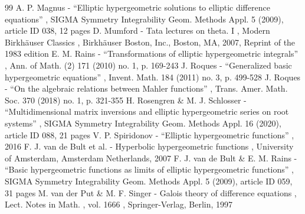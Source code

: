 \begin{thebibliography}{99}
 A. P. Magnus - “Elliptic hypergeometric solutions to elliptic difference equations” , SIGMA Symmetry Integrability Geom. Methods Appl. 5 (2009), article ID 038, 12 pages
 D. Mumford - Tata lectures on theta. I , Modern Birkhäuser Classics , Birkhäuser Boston, Inc., Boston, MA, 2007, Reprint of the 1983 edition
 E. M. Rains - “Transformations of elliptic hypergeometric integrals” , Ann. of Math. (2) 171 (2010) no. 1, p. 169-243
 J. Roques - “Generalized basic hypergeometric equations” , Invent. Math. 184 (2011) no. 3, p. 499-528
 J. Roques - “On the algebraic relations between Mahler functions” , Trans. Amer. Math. Soc. 370 (2018) no. 1, p. 321-355
 H. Rosengren \& M. J. Schlosser - “Multidimensional matrix inversions and elliptic hypergeometric series on root systems” , SIGMA Symmetry Integrability Geom. Methods Appl. 16 (2020), article ID 088, 21 pages
 V. P. Spiridonov - “Elliptic hypergeometric functions” , 2016
 F. J. van de Bult et al. - Hyperbolic hypergeometric functions , University of Amsterdam, Amsterdam Netherlands, 2007
 F. J. van de Bult \& E. M. Rains - “Basic hypergeometric functions as limits of elliptic hypergeometric functions” , SIGMA Symmetry Integrability Geom. Methods Appl. 5 (2009), article ID 059, 31 pages
 M. van der Put \& M. F. Singer - Galois theory of difference equations , Lect. Notes in Math. , vol. 1666 , Springer-Verlag, Berlin, 1997
\end{thebibliography}
